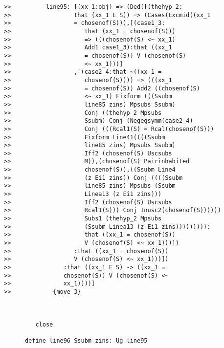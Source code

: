 \documentclass[12pt]{article}
\begin{document}
\begin{verbatim}
>>          line95: [(xx_1:obj) => (Ded([(thehyp_2:
>>                  that (xx_1 E S)) => (Cases(Excmid((xx_1
>>                  = chosenof(S))),[(case1_3:
>>                     that (xx_1 = chosenof(S)))
>>                     => (((chosenof(S) <~ xx_1)
>>                     Add1 case1_3):that ((xx_1
>>                     = chosenof(S)) V (chosenof(S)
>>                     <~ xx_1)))]
>>                  ,[(case2_4:that ~((xx_1 =
>>                     chosenof(S)))) => (((xx_1
>>                     = chosenof(S)) Add2 ((chosenof(S)
>>                     <~ xx_1) Fixform (((Ssubm
>>                     line85 zins) Mpsubs Ssubm)
>>                     Conj ((thehyp_2 Mpsubs
>>                     Ssubm) Conj (Negeqsymm(case2_4)
>>                     Conj (((Rcal1(S) = Rcal(chosenof(S)))
>>                     Fixform Line41((((Ssubm
>>                     line85 zins) Mpsubs Ssubm)
>>                     Iff2 (chosenof(S) Uscsubs
>>                     M)),(chosenof(S) Pairinhabited
>>                     chosenof(S)),((Ssubm Line4
>>                     (z Ei1 zins)) Conj ((((Ssubm
>>                     line85 zins) Mpsubs (Ssubm
>>                     Linea13 (z Ei1 zins)))
>>                     Iff2 (chosenof(S) Uscsubs
>>                     Rcal1(S))) Conj Inusc2(chosenof(S))))))
>>                     Subs1 (thehyp_2 Mpsubs
>>                     (Ssubm Linea13 (z Ei1 zins))))))))):
>>                     that ((xx_1 = chosenof(S))
>>                     V (chosenof(S) <~ xx_1)))])
>>                  :that ((xx_1 = chosenof(S))
>>                  V (chosenof(S) <~ xx_1)))])
>>               :that ((xx_1 E S) -> ((xx_1 =
>>               chosenof(S)) V (chosenof(S) <~
>>               xx_1))))]
>>            {move 3}



         close

      define line96 Ssubm zins: Ug line95



\end{verbatim}
\end{document}
